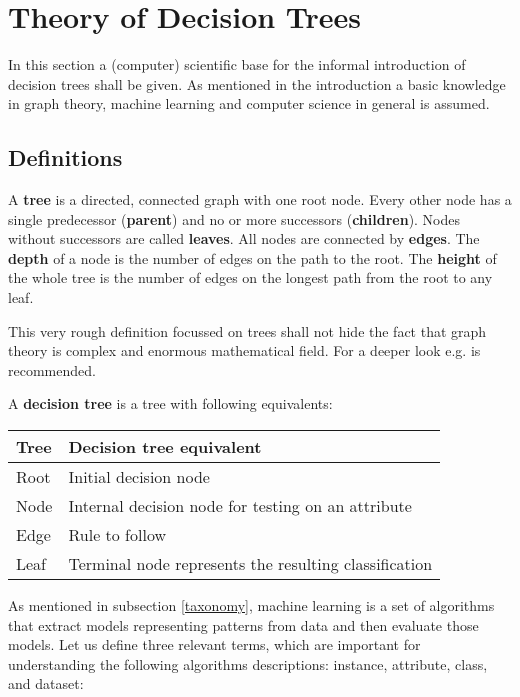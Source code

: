 
\section{Theory of Decision Trees}

In this section a (computer) scientific base for the informal introduction of decision trees shall be given. As mentioned in the introduction a basic knowledge in graph theory, machine learning and computer science in general is assumed.


\subsection{Definitions}

\begin{definition}
A \textbf{tree} is a directed, connected graph with one root node. Every other node has a single predecessor (\textbf{parent}) and no or more successors (\textbf{children}). Nodes without successors are called \textbf{leaves}. All nodes are connected by \textbf{edges}. The \textbf{depth} of a node is the number of edges on the path to the root. The \textbf{height} of the whole tree is the number of edges on the longest path from the root to any leaf. 
\end{definition}

\begin{remark}
This very rough definition focussed on trees shall not hide the fact that graph theory is complex and enormous mathematical field. For a deeper look e.g. \cite{cormen2001introduction} is recommended.
\end{remark}

\begin{definition}
A \textbf{decision tree} is a tree with following equivalents:
\begin{center}
\begin{tabular}{l|l} 
    \textbf{Tree} &  \textbf{Decision tree equivalent} \\ \hline
    Root & Initial decision node  \\ 
    Node & Internal decision node for testing on an attribute  \\ 
    Edge & Rule to follow \\ 
    Leaf & Terminal node represents the resulting classification 
\end{tabular}
\end{center}
\end{definition}

As mentioned in subsection \ref{taxonomy}, machine learning is a set of algorithms that extract models representing patterns from data and then evaluate those models. Let us define three relevant terms, which are important for understanding the following algorithms descriptions: instance, attribute, class, and dataset:

